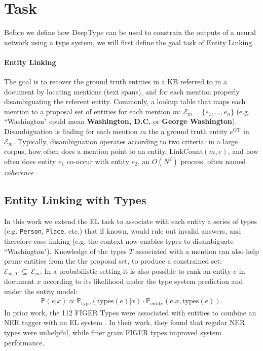 \documentclass[letterpaper]{article}
\begin{document}
\section{Task}

Before we define how DeepType can be used to constrain the outputs of a neural network using a type system, we will first define the goal task of Entity Linking.
\paragraph{Entity Linking} The goal is to recover the ground truth entities in a KB referred to in a document by locating mentions (text spans), and for each mention properly disambiguating the referent entity. Commonly, a lookup table that maps each mention to a proposal set of entities for each mention $m$: $\mathcal{E}_m=\{e_1,\dots,e_n\}$ (e.g. ``Washington" could mean \textbf{Washington, D.C.} or \textbf{George Washington}). Disambiguation is finding for each mention $m$ the a ground truth entity $e^{\mathrm{GT}}$ in $\mathcal{E}_m$. Typically, disambiguation operates according to two criteria: in a large corpus, how often does a mention point to an entity, $\mathrm{LinkCount}(m, e)$, and how often does entity $e_1$ co-occur with entity $e_2$, an $O(N^2)$ process, often named {\em coherence} \cite{milne2008learning,tagme,yamada2016joint}.

\subsection{Entity Linking with Types}
In this work we extend the EL task to associate with each entity a series of types (e.g. \texttt{Person}, \texttt{Place}, etc.) that if known, would rule out invalid answers, and therefore ease linking (e.g. the context now enables types to disambiguate ``Washington"). Knowledge of the types $T$ associated with a mention can also help prune entities from the the proposal set, to produce a constrained set: $\mathcal{E}_{m, T}~\subseteq~\mathcal{E}_m$.
In a probabilistic setting it is also possible to rank an entity $e$ in document $x$ according to its likelihood under the type system prediction and under the entity model:
\begin{align}
\mathbb P(e|x) \propto \mathbb P_{\mathrm{type}}(\mathrm{types}(e)|x) \cdot \mathbb P_{\mathrm{entity}}(e|x, \mathrm{types}(e)).
\end{align}
In prior work, the 112 FIGER Types \cite{ling2012fine} were associated with entities to combine an NER tagger with an EL system \cite{ling2015design}. In their work, they found that regular NER types were unhelpful, while finer grain FIGER types improved system performance.
\end{document}
